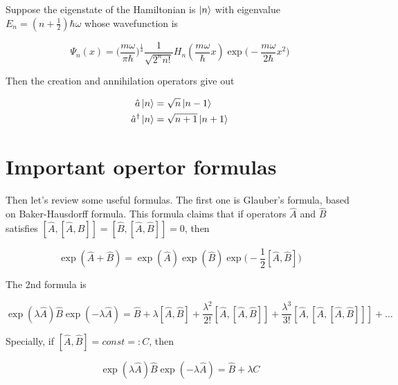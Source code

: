 \documentclass{article}
\begin{document}
        Suppose the eigenstate of the Hamiltonian is $\ket{n}$ with eigenvalue $E_n=(n+\frac{1}{2})\hbar\omega$ whose wavefunction is 
        
        \begin{equation}
            \Psi_n(x)=\bigl(\frac{m\omega}{\pi\hbar}\bigr)^{\frac{1}{4}}\frac{1}{\sqrt{2^n n!}}H_n(\frac{m\omega}{\hbar}x)\exp\bigl(-\frac{m\omega}{2\hbar}x^2\bigr)
        \end{equation}
        
        Then the creation and annihilation operators give out

        \begin{equation}
            \begin{split}
                \hat{a}\ket{n}&=\sqrt{n}\ket{n-1} \\
                \hat{a}^\dagger\ket{n}&=\sqrt{n+1}\ket{n+1}
            \end{split}
        \end{equation}

        \section{Important opertor formulas}

        Then let's review some useful formulas. The first one is Glauber's formula, based on Baker-Hausdorff formula. This formula claims that if operators $\hat{A}$ and $\hat{B}$ satisfies $[\hat{A}, [\hat{A}, \hat{B}]] = [\hat{B}, [\hat{A}, \hat{B}]] = 0$, then 

        \begin{equation}\label{formula1}
            \exp(\hat{A}+\hat{B}) = \exp(\hat{A})\exp(\hat{B})\exp\biggl(-\frac{1}{2}[\hat{A}, \hat{B}]\biggr)
        \end{equation}

        The 2nd formula is 

        \begin{equation}\label{formula2}
            \exp(\lambda\hat{A})\hat{B}\exp(-\lambda\hat{A}) = \hat{B} + \lambda [\hat{A},\hat{B}] + \frac{\lambda^2}{2!} [\hat{A}, [\hat{A}, \hat{B}]] + \frac{\lambda^3}{3!}[\hat{A}, [\hat{A}, [\hat{A}, \hat{B}]]] + \dots
        \end{equation}

        Specially, if $[\hat{A}, \hat{B}]=const=:C$, then 

        \begin{equation}
            \exp(\lambda\hat{A})\hat{B}\exp(-\lambda\hat{A}) = \hat{B} + \lambda C
        \end{equation}
\end{document}
